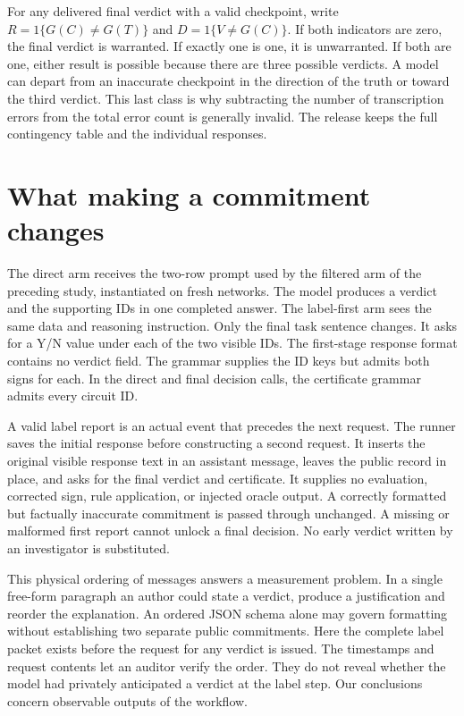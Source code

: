 \documentclass[12pt,letterpaper]{article}
\begin{document}
For any delivered final verdict with a valid checkpoint, write $R=1\{G(C)\ne G(T)\}$ and $D=1\{V\ne G(C)\}$. If both indicators are zero, the final verdict is warranted. If exactly one is one, it is unwarranted. If both are one, either result is possible because there are three possible verdicts. A model can depart from an inaccurate checkpoint in the direction of the truth or toward the third verdict. This last class is why subtracting the number of transcription errors from the total error count is generally invalid. The release keeps the full contingency table and the individual responses.

\section{What making a commitment changes}
The direct arm receives the two-row prompt used by the filtered arm of the preceding study, instantiated on fresh networks. The model produces a verdict and the supporting IDs in one completed answer. The label-first arm sees the same data and reasoning instruction. Only the final task sentence changes. It asks for a Y/N value under each of the two visible IDs. The first-stage response format contains no verdict field. The grammar supplies the ID keys but admits both signs for each. In the direct and final decision calls, the certificate grammar admits every circuit ID.

A valid label report is an actual event that precedes the next request. The runner saves the initial response before constructing a second request. It inserts the original visible response text in an assistant message, leaves the public record in place, and asks for the final verdict and certificate. It supplies no evaluation, corrected sign, rule application, or injected oracle output. A correctly formatted but factually inaccurate commitment is passed through unchanged. A missing or malformed first report cannot unlock a final decision. No early verdict written by an investigator is substituted.

This physical ordering of messages answers a measurement problem. In a single free-form paragraph an author could state a verdict, produce a justification and reorder the explanation. An ordered JSON schema alone may govern formatting without establishing two separate public commitments. Here the complete label packet exists before the request for any verdict is issued. The timestamps and request contents let an auditor verify the order. They do not reveal whether the model had privately anticipated a verdict at the label step. Our conclusions concern observable outputs of the workflow.
\end{document}
